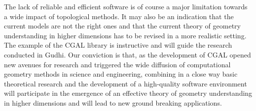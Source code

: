 The lack of reliable and efficient software is of course a major limitation towards a wide impact of topological methods. It may also be an indication that the current models are not the right ones and that the current theory of geometry understanding in higher dimensions has to be revised
in a more realistic setting.  The example of the CGAL library is instructive and will guide the research conducted in Gudhi. Our conviction is that, as the development of CGAL opened new avenues for research and triggered the wide diffusion of computational geometry methods in science and engineering, combining in a close way basic theoretical research and the development of a high-quality software environment will participate in the emergence of 
an effective theory of geometry understanding in higher dimensions and will lead to new ground breaking applications.



